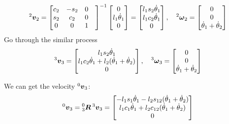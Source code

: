 \documentclass[a4paper]{article}
\begin{document}
\begin{equation}
\prescript{2}{}{\boldsymbol{v}}_2 = 
\left [
\begin{matrix}
   c_2 & -s_2 & 0  \\
   s_2 & c_2 & 0 \\
   0 & 0 & 1 & \\
\end{matrix}
\right ]^{-1}
\left [
\begin{matrix}
   0  \\
   l_1\dot{\theta}_1\\
   0  \\
\end{matrix}
\right ] = 
\left [
\begin{matrix}
   l_1s_2\dot\theta_1  \\
   l_1c_2\dot\theta_1\\
   0  \\
\end{matrix}
\right ],\ \ \
\prescript{2}{}{\boldsymbol{\omega}}_2 = 
\left [
\begin{matrix}
   0  \\
   0 \\
   \dot\theta_1+ \dot\theta_2 \\
\end{matrix}
\right ]
\end{equation}
\noindent Go through the similar process
\begin{equation}
\prescript{3}{}{\boldsymbol{v}}_3 = 
\left [
\begin{matrix}
   l_1s_2\dot\theta_1  \\
   l_1c_2\dot\theta_1 + l_2(\dot\theta_1 + \dot\theta_2)  \\
   0  \\
\end{matrix}
\right ],\ \ \
\prescript{3}{}{\boldsymbol{\omega}}_3 = 
\left [
\begin{matrix}
   0  \\
   0 \\
   \dot\theta_1+ \dot\theta_2 \\
\end{matrix}
\right ]
\end{equation}

\noindent We can get the velocity $\prescript{0}{}{\boldsymbol{v}}_3$:
\begin{equation}
\prescript{0}{}{\boldsymbol{v}}_3 = \prescript{0}{3}{\boldsymbol{R}}\prescript{3}{}{\boldsymbol{v}}_3 =
\left [
\begin{matrix}
   -l_1s_1\dot\theta_1-l_2s_{12}(\dot\theta_1+\dot\theta_2)  \\
   l_1c_1\dot\theta_1+l_2c_{12}(\dot\theta_1+\dot\theta_2) \\ 
   0 \\
\end{matrix}
\right ]   
\end{equation}
\end{document}
